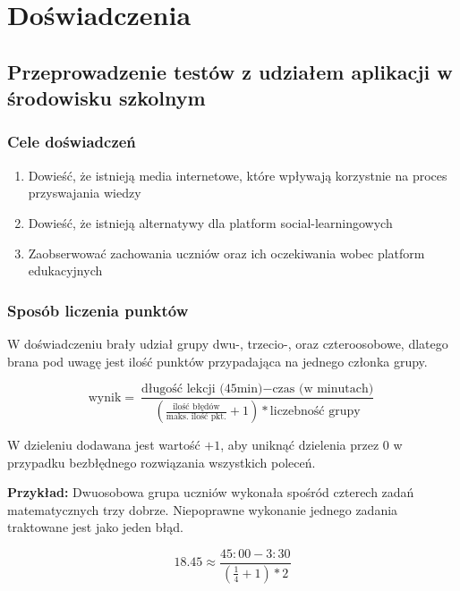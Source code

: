 \documentclass[10pt]{beamer}
\begin{document}
\section{Doświadczenia}
\subsection{Przeprowadzenie testów z udziałem aplikacji w środowisku szkolnym}

\begin{frame}
\frametitle{Cele doświadczeń}
\begin{enumerate}
  \item Dowieść, że istnieją media internetowe, które wpływają korzystnie na proces przyswajania wiedzy
  \item Dowieść, że istnieją alternatywy dla platform social-learningowych
  \item Zaobserwować zachowania uczniów oraz ich oczekiwania wobec platform edukacyjnych
\end{enumerate}
\end{frame}

\begin{frame}
\frametitle{Sposób liczenia punktów}
\small
W doświadczeniu brały udział grupy dwu-, trzecio-, oraz czteroosobowe, dlatego brana pod uwagę jest ilość punktów przypadająca na jednego członka grupy.

$$\text{wynik} = \frac{\text{długość lekcji (45min)} - \text{czas (w minutach)}}{ (\frac{\text{ilość błędów}}{\text{maks. ilość pkt.}}+1) * \text{liczebność grupy}}$$

W dzieleniu dodawana jest wartość $+1$, aby uniknąć dzielenia przez $0$ w przypadku bezbłędnego rozwiązania wszystkich poleceń.

\textbf{Przykład:} Dwuosobowa grupa uczniów wykonała spośród czterech zadań matematycznych trzy dobrze. Niepoprawne wykonanie jednego zadania traktowane jest jako jeden błąd.

$$18.45 \approx \frac{45:00 - 3:30}{ (\frac{1}{4}+1) * \text{2}}$$
\end{frame}
\end{document}
